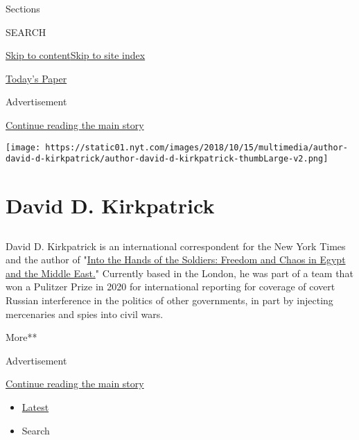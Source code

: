 Sections

SEARCH

\protect\hyperlink{site-content}{Skip to
content}\protect\hyperlink{site-index}{Skip to site index}

\href{https://myaccount.nytimes.com/auth/login?response_type=cookie\&client_id=vi}{}

\href{https://www.nytimes.com/section/todayspaper}{Today's Paper}

Advertisement

\protect\hyperlink{after-top}{Continue reading the main story}

\texttt{[image: https://static01.nyt.com/images/2018/10/15/multimedia/author-david-d-kirkpatrick/author-david-d-kirkpatrick-thumbLarge-v2.png]}

\hypertarget{david-d-kirkpatrick}{%
\section{David D. Kirkpatrick}\label{david-d-kirkpatrick}}

\subsection{}

David D. Kirkpatrick is an international correspondent for the New York
Times and the author of
"\href{https://www.penguinrandomhouse.com/search/into-the-hands-of-the-soldiers?q=into\%20the\%20hands\%20of\%20the\%20soldiers}{Into
the Hands of the Soldiers: Freedom and Chaos in Egypt and the Middle
East.}" Currently based in the London, he was part of a team that won a
Pulitzer Prize in 2020 for international reporting for coverage of
covert Russian interference in the politics of other governments, in
part by injecting mercenaries and spies into civil wars.

More**

Advertisement

\protect\hyperlink{after-mid1}{Continue reading the main story}

\begin{itemize}
\tightlist
\item
  \protect\hyperlink{stream-panel}{Latest}
\item
  Search
\end{itemize}

